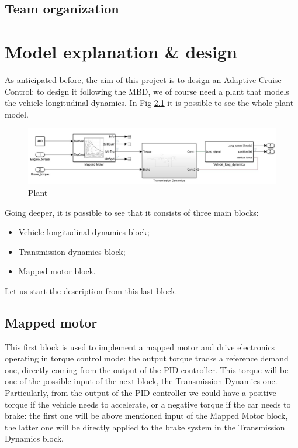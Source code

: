 \documentclass[12pt,a4paper]{report}
\begin{document}
\section{Team organization}


\chapter{Model explanation \& design}
As anticipated before, the aim of this project is to design an Adaptive Cruise Control: to design it following the MBD, we of course need a plant that models the vehicle longitudinal dynamics.
In Fig \ref{Plant} it is possible to see the whole plant model.

\begin{figure}[htbp]
	\centering
	\includegraphics[scale=0.5]{Plant.jpg}
	\caption{Plant}
	\label{Plant}
\end{figure}


Going deeper, it is possible to see that it consists of three main blocks:

\begin{itemize}
	
	\item Vehicle longitudinal dynamics block;
	
	\item Transmission dynamics block;
	
	\item Mapped motor block.
	
\end{itemize}

Let us start the description from this last block.

\section{Mapped motor}

This first block is used to implement a mapped motor and drive electronics operating in torque control mode: the output torque tracks a reference demand one, directly coming from the output of the PID controller. This torque will be one of the possible input of the next block, the Transmission Dynamics one. Particularly, from the output of the PID controller we could have a positive torque if the vehicle needs to accelerate, or a negative torque if the car needs to brake: the first one will be above mentioned input of the Mapped Motor block, the latter one will be directly applied to the brake system in the Transmission Dynamics block.
\end{document}
